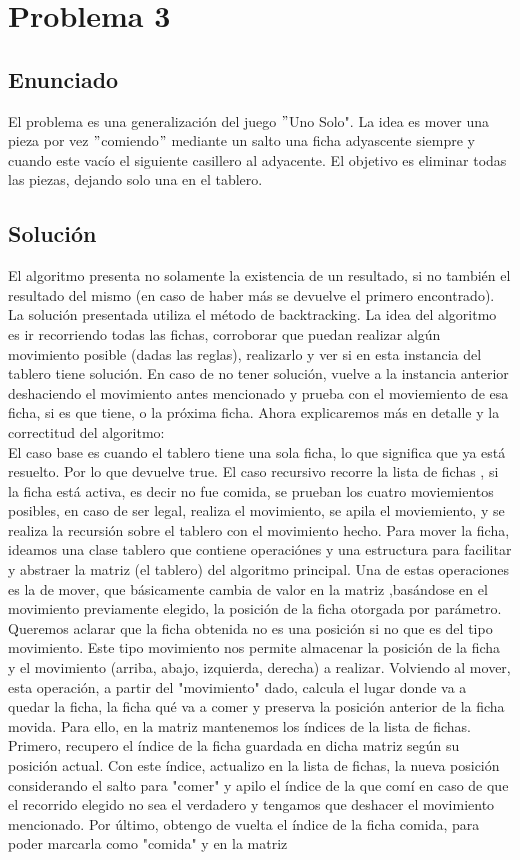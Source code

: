 \section{Problema 3}
\subsection{Enunciado}
El problema es una generalización del juego $"$Uno Solo".
La idea es mover una pieza por vez $"$comiendo$"$ mediante un salto una ficha
adyascente siempre y cuando este vacío el siguiente casillero al adyacente.
El objetivo es eliminar todas las piezas, dejando solo una en el tablero.

\subsection{Soluci\'on}
El algoritmo presenta no solamente la existencia de un resultado, si no también el resultado del mismo (en caso de haber más se devuelve el primero encontrado).
La solución presentada utiliza el método de backtracking. La idea del algoritmo es ir recorriendo todas las fichas, corroborar que puedan realizar algún movimiento posible (dadas las reglas), realizarlo y ver si en esta instancia del tablero tiene solución. En caso de no tener solución, vuelve a la instancia anterior deshaciendo el movimiento antes mencionado y prueba con el moviemiento de esa ficha, si es que tiene, o la próxima ficha.
Ahora explicaremos más en detalle y la correctitud del algoritmo:\\
El caso base es cuando el tablero tiene una sola ficha, lo que significa que ya está resuelto. Por lo que devuelve true.
El caso recursivo recorre la lista de fichas , si la ficha está activa, es decir no fue comida, 
se prueban los cuatro moviemientos posibles, en caso de ser legal, realiza el movimiento, se apila el moviemiento, y se realiza la recursión sobre el tablero con el movimiento hecho.
Para mover la ficha, ideamos una clase tablero que contiene operaciónes y una estructura para facilitar y abstraer la matriz (el tablero) del algoritmo principal. Una de estas operaciones es la de mover, que básicamente cambia de valor en la matriz ,basándose en el movimiento previamente elegido, la posición de la ficha otorgada por parámetro. Queremos aclarar que la ficha obtenida no es una posición si no que es del tipo movimiento.
Este tipo movimiento nos permite almacenar la posición de la ficha y el movimiento (arriba, abajo, izquierda, derecha) a realizar. 
Volviendo al mover, esta operación, a partir del "movimiento" dado, calcula el lugar donde va a quedar la ficha, la ficha qué va a comer y preserva la posición anterior de la ficha movida. Para ello, en la matriz mantenemos los índices de la lista de fichas. Primero, recupero el índice de la ficha guardada en dicha matriz según su posición actual. Con este índice, actualizo en la lista de fichas, la nueva posición considerando el salto para "comer" y apilo el índice de la que comí en caso de que el recorrido elegido no sea el verdadero y tengamos que deshacer el movimiento mencionado. Por último, obtengo de vuelta el índice de la ficha comida, para poder marcarla como "comida" y en la matriz 
